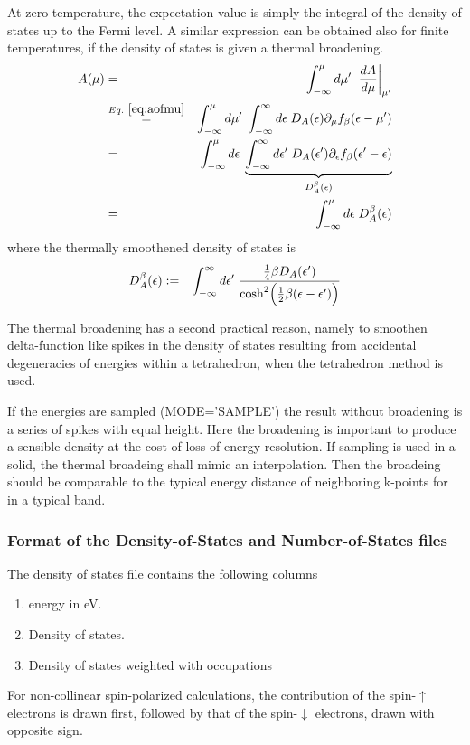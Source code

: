 \documentclass[final,12pt,makeidx,DIV=calc]{article}
\begin{document}
{{{{{{At zero  temperature, the expectation  value is simply the  integral of
the density of states up to  the Fermi level. A similar expression can
be obtained also for finite temperatures,  if the density of states is
given a thermal broadening.
\begin{eqnarray}
A(\mu)
&=&\int_{-\infty}^\mu d\mu'\;\left.\frac{dA}{d\mu}\right|_{\mu'}
\nonumber\\
&\stackrel{Eq.~\ref{eq:aofmu}}{=}&
\int_{-\infty}^\mu d\mu'\;
\int_{-\infty}^\infty d\epsilon\; D_A(\epsilon) \partial_\mu 
f_\beta(\epsilon-\mu')
\nonumber\\
&=&\int_{-\infty}^\mu d\epsilon\;
\underbrace{
\int_{-\infty}^\infty d\epsilon'\; D_A(\epsilon') \partial_\epsilon 
f_\beta(\epsilon'-\epsilon)}
_{D_A^{\beta}(\epsilon)}
\nonumber\\
&=&\int_{-\infty}^\mu d\epsilon\;D^\beta_A(\epsilon)
\end{eqnarray}
where the thermally smoothened density of states is
\begin{eqnarray}
D_A^{\beta}(\epsilon)
&:=&
\int_{-\infty}^\infty d\epsilon'\; 
\frac{\frac{1}{4}\beta D_A(\epsilon')}
{\cosh^2\Bigl(\frac{1}{2}\beta(\epsilon-\epsilon')\Bigr)}
\end{eqnarray}


The thermal broadening has a second practical reason, namely to
smoothen delta-function like spikes in the density of states resulting
from accidental degeneracies of energies within a tetrahedron, when
the tetrahedron method is used.

If the energies are sampled (MODE='SAMPLE') the result without
broadening is a series of spikes with equal height. Here the broadening
is important to produce a sensible density at the cost of loss of
energy resolution. If sampling is used in a solid, the thermal
broadeing shall mimic an interpolation. Then the broadeing should be
comparable to the typical energy distance of neighboring k-points for
in a typical band.

\subsubsection{Format of the Density-of-States and Number-of-States files}
\label{sec:formatdosfile}
The density of states file contains the following columns
\begin{enumerate}
\item energy in eV.
\item Density of states. 
\item Density of states weighted with occupations 
\end{enumerate}
For non-collinear spin-polarized calculations, the 
contribution of the spin-$\uparrow$ electrons is drawn first, followed
by that of the spin-$\downarrow$ electrons, drawn with opposite sign. 

}}}}}}
\end{document}
